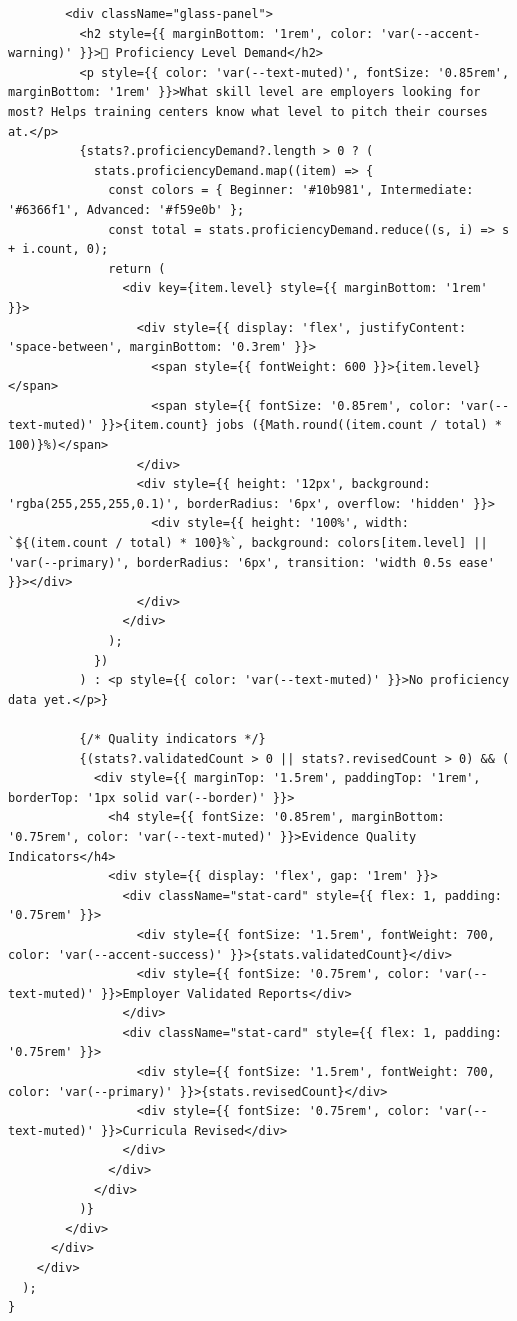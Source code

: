 \documentclass[12pt,a4paper]{report}
\begin{document}
\begin{verbatim}
        <div className="glass-panel">
          <h2 style={{ marginBottom: '1rem', color: 'var(--accent-warning)' }}>🧬 Proficiency Level Demand</h2>
          <p style={{ color: 'var(--text-muted)', fontSize: '0.85rem', marginBottom: '1rem' }}>What skill level are employers looking for most? Helps training centers know what level to pitch their courses at.</p>
          {stats?.proficiencyDemand?.length > 0 ? (
            stats.proficiencyDemand.map((item) => {
              const colors = { Beginner: '#10b981', Intermediate: '#6366f1', Advanced: '#f59e0b' };
              const total = stats.proficiencyDemand.reduce((s, i) => s + i.count, 0);
              return (
                <div key={item.level} style={{ marginBottom: '1rem' }}>
                  <div style={{ display: 'flex', justifyContent: 'space-between', marginBottom: '0.3rem' }}>
                    <span style={{ fontWeight: 600 }}>{item.level}</span>
                    <span style={{ fontSize: '0.85rem', color: 'var(--text-muted)' }}>{item.count} jobs ({Math.round((item.count / total) * 100)}%)</span>
                  </div>
                  <div style={{ height: '12px', background: 'rgba(255,255,255,0.1)', borderRadius: '6px', overflow: 'hidden' }}>
                    <div style={{ height: '100%', width: `${(item.count / total) * 100}%`, background: colors[item.level] || 'var(--primary)', borderRadius: '6px', transition: 'width 0.5s ease' }}></div>
                  </div>
                </div>
              );
            })
          ) : <p style={{ color: 'var(--text-muted)' }}>No proficiency data yet.</p>}

          {/* Quality indicators */}
          {(stats?.validatedCount > 0 || stats?.revisedCount > 0) && (
            <div style={{ marginTop: '1.5rem', paddingTop: '1rem', borderTop: '1px solid var(--border)' }}>
              <h4 style={{ fontSize: '0.85rem', marginBottom: '0.75rem', color: 'var(--text-muted)' }}>Evidence Quality Indicators</h4>
              <div style={{ display: 'flex', gap: '1rem' }}>
                <div className="stat-card" style={{ flex: 1, padding: '0.75rem' }}>
                  <div style={{ fontSize: '1.5rem', fontWeight: 700, color: 'var(--accent-success)' }}>{stats.validatedCount}</div>
                  <div style={{ fontSize: '0.75rem', color: 'var(--text-muted)' }}>Employer Validated Reports</div>
                </div>
                <div className="stat-card" style={{ flex: 1, padding: '0.75rem' }}>
                  <div style={{ fontSize: '1.5rem', fontWeight: 700, color: 'var(--primary)' }}>{stats.revisedCount}</div>
                  <div style={{ fontSize: '0.75rem', color: 'var(--text-muted)' }}>Curricula Revised</div>
                </div>
              </div>
            </div>
          )}
        </div>
      </div>
    </div>
  );
}


\end{verbatim}
\end{document}
